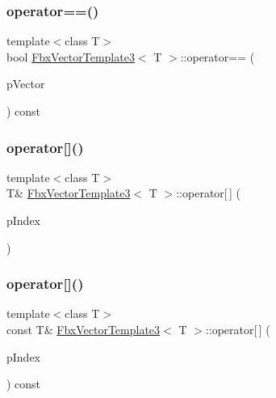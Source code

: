 \subsubsection{\texorpdfstring{operator==()}{operator==()}}
{\footnotesize\ttfamily template$<$class T$>$ \\
bool \hyperlink{class_fbx_vector_template3}{Fbx\+Vector\+Template3}$<$ T $>$\+::operator== (\begin{DoxyParamCaption}\item[{const \hyperlink{class_fbx_vector_template3}{Fbx\+Vector\+Template3}$<$ T $>$ \&}]{p\+Vector }\end{DoxyParamCaption}) const}

\mbox{\label{class_fbx_vector_template3_a8bf2926bdd00fd0322f826a572eb516d}} 
\subsubsection{\texorpdfstring{operator[]()}{operator[]()}\hspace{0.1cm}{\footnotesize\ttfamily [1/2]}}
{\footnotesize\ttfamily template$<$class T$>$ \\
T\& \hyperlink{class_fbx_vector_template3}{Fbx\+Vector\+Template3}$<$ T $>$\+::operator\mbox{[}$\,$\mbox{]} (\begin{DoxyParamCaption}\item[{int}]{p\+Index }\end{DoxyParamCaption})}

\mbox{\label{class_fbx_vector_template3_a54b2f30b8fd0d4b32bf6df936682d5f0}} 
\subsubsection{\texorpdfstring{operator[]()}{operator[]()}\hspace{0.1cm}{\footnotesize\ttfamily [2/2]}}
{\footnotesize\ttfamily template$<$class T$>$ \\
const T\& \hyperlink{class_fbx_vector_template3}{Fbx\+Vector\+Template3}$<$ T $>$\+::operator\mbox{[}$\,$\mbox{]} (\begin{DoxyParamCaption}\item[{int}]{p\+Index }\end{DoxyParamCaption}) const}



